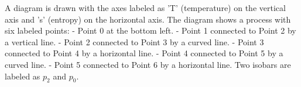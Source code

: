 A diagram is drawn with the axes labeled as 'T' (temperature) on the vertical axis and 's' (entropy) on the horizontal axis. The diagram shows a process with six labeled points:  
- Point 0 at the bottom left.  
- Point 1 connected to Point 2 by a vertical line.  
- Point 2 connected to Point 3 by a curved line.  
- Point 3 connected to Point 4 by a horizontal line.  
- Point 4 connected to Point 5 by a curved line.  
- Point 5 connected to Point 6 by a horizontal line.  
Two isobars are labeled as \( p_2 \) and \( p_0 \).